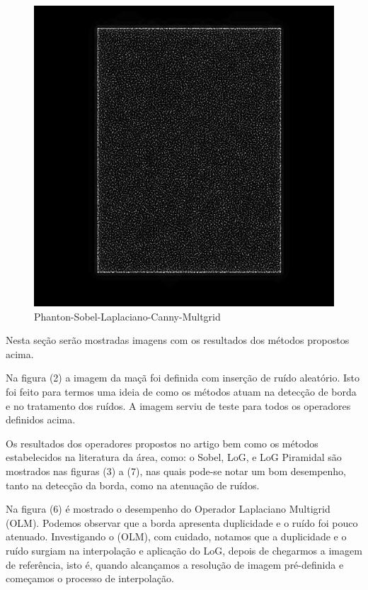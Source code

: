 \documentclass[a4paper]{article} %
\begin{document}
\begin{figure}[!htb]
\endminipage\hfill
{}%
  \includegraphics[width=\linewidth]{mult_Eq_Phantom_0p700_4_1_1.jpg}
\endminipage
\caption{Phanton-Sobel-Laplaciano-Canny-Multgrid}\label{fig:awesome_image3}
\end{figure}
Nesta seção serão mostradas imagens com os resultados dos métodos propostos acima. 

Na figura (2) a imagem da maçã foi definida com inserção de ruído aleatório. Isto foi feito para termos uma ideia de como os métodos atuam na detecção de borda e no tratamento dos ruídos. A imagem serviu de teste para todos os operadores definidos acima.

Os resultados dos operadores propostos no artigo bem como os métodos estabelecidos na literatura da área, como: o Sobel, LoG, e LoG Piramidal são mostrados nas figuras (3) a (7), nas quais pode-se notar um bom desempenho, tanto na detecção da borda, como na atenuação de ruídos.


Na figura (6) é mostrado o desempenho do Operador Laplaciano Multigrid (OLM). Podemos observar que a borda apresenta duplicidade e o ruído foi pouco atenuado. Investigando o (OLM), com cuidado, notamos que a duplicidade e o ruído surgiam na interpolação e aplicação do LoG, depois de chegarmos a imagem de referência, isto é,  quando alcançamos a resolução de imagem pré-definida e começamos o processo de interpolação.
\end{document}
